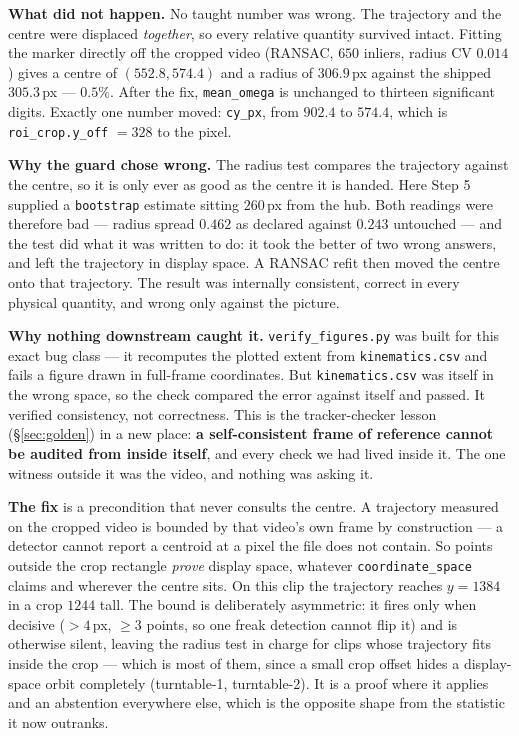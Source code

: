 \documentclass[11pt,a4paper]{article}
\begin{document}
\textbf{What did not happen.} No taught number was wrong. The trajectory and the centre were
displaced \emph{together}, so every relative quantity survived intact. Fitting the marker directly
off the cropped video (RANSAC, $650$ inliers, radius CV $0.014$) gives a centre of
$(552.8, 574.4)$ and a radius of $306.9$\,px against the shipped $305.3$\,px --- $0.5\%$. After the
fix, \texttt{mean\_omega} is unchanged to thirteen significant digits. Exactly one number moved:
\texttt{cy\_px}, from $902.4$ to $574.4$, which is \texttt{roi\_crop.y\_off} $=328$ to the pixel.

\textbf{Why the guard chose wrong.} The radius test compares the trajectory against the centre, so
it is only ever as good as the centre it is handed. Here Step 5 supplied a \texttt{bootstrap}
estimate sitting $260$\,px from the hub. Both readings were therefore bad --- radius spread $0.462$
as declared against $0.243$ untouched --- and the test did what it was written to do: it took the
better of two wrong answers, and left the trajectory in display space. A RANSAC refit then moved
the centre onto that trajectory. The result was internally consistent, correct in every physical
quantity, and wrong only against the picture.

\textbf{Why nothing downstream caught it.} \texttt{verify\_figures.py} was built for this exact bug
class --- it recomputes the plotted extent from \texttt{kinematics.csv} and fails a figure drawn in
full-frame coordinates. But \texttt{kinematics.csv} was itself in the wrong space, so the check
compared the error against itself and passed. It verified consistency, not correctness. This is
the tracker-checker lesson (\S\ref{sec:golden}) in a new place: \textbf{a self-consistent frame of
reference cannot be audited from inside itself}, and every check we had lived inside it. The one
witness outside it was the video, and nothing was asking it.

\textbf{The fix} is a precondition that never consults the centre. A trajectory measured on the
cropped video is bounded by that video's own frame by construction --- a detector cannot report a
centroid at a pixel the file does not contain. So points outside the crop rectangle \emph{prove}
display space, whatever \texttt{coordinate\_space} claims and wherever the centre sits. On this
clip the trajectory reaches $y = 1384$ in a crop $1244$ tall. The bound is deliberately
asymmetric: it fires only when decisive ($>4$\,px, $\geq 3$ points, so one freak detection cannot
flip it) and is otherwise silent, leaving the radius test in charge for clips whose trajectory
fits inside the crop --- which is most of them, since a small crop offset hides a display-space
orbit completely (turntable-1, turntable-2). It is a proof where it applies and an abstention
everywhere else, which is the opposite shape from the statistic it now outranks.
\end{document}
